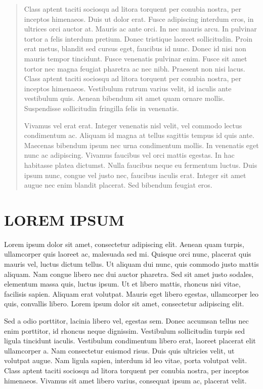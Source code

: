 \documentclass[rascunho,xindy]{fei}
\begin{document}
\begin{abstract}
Class aptent taciti sociosqu ad litora torquent per conubia nostra, per inceptos himenaeos. Duis ut dolor erat. Fusce adipiscing interdum eros, in ultrices orci auctor at. Mauris ac ante orci. In nec mauris arcu. In pulvinar tortor a felis interdum pretium. Donec tristique laoreet sollicitudin. Proin erat metus, blandit sed cursus eget, faucibus id nunc. Donec id nisi non mauris tempor tincidunt. Fusce venenatis pulvinar enim. Fusce sit amet tortor nec magna feugiat pharetra ac nec nibh. Praesent non nisi lacus. Class aptent taciti sociosqu ad litora torquent per conubia nostra, per inceptos himenaeos. Vestibulum rutrum varius velit, id iaculis ante vestibulum quis. Aenean bibendum sit amet quam ornare mollis. Suspendisse sollicitudin fringilla felis in venenatis.

Vivamus vel erat erat. Integer venenatis nisl velit, vel commodo lectus condimentum ac. Aliquam id magna at tellus sagittis tempus id quis ante. Maecenas bibendum ipsum nec urna condimentum mollis. In venenatis eget nunc ac adipiscing. Vivamus faucibus vel orci mattis egestas. In hac habitasse platea dictumst. Nulla faucibus neque eu fermentum luctus. Duis ipsum nunc, congue vel justo nec, faucibus iaculis erat. Integer sit amet augue nec enim blandit placerat. Sed bibendum feugiat eros.
\end{abstract}

\listoffigures
\listoftables
\listofalgorithms
\glsaddall
\printglossaries
\tableofcontents

\chapter{LOREM IPSUM}

Lorem ipsum dolor sit amet, consectetur adipiscing elit. Aenean quam turpis, ullamcorper quis laoreet ac, malesuada sed mi. Quisque orci nunc, placerat quis mauris vel, luctus dictum tellus. Ut aliquam dui nunc, quis commodo justo mattis aliquam. Nam congue libero nec dui auctor pharetra. Sed sit amet justo sodales, elementum massa quis, luctus ipsum. Ut et libero mattis, rhoncus nisi vitae, facilisis sapien. Aliquam erat volutpat. Mauris eget libero egestas, ullamcorper leo quis, convallis libero. Lorem ipsum dolor sit amet, consectetur adipiscing elit.

Sed a odio porttitor, lacinia libero vel, egestas sem. Donec accumsan tellus nec enim porttitor, id rhoncus neque dignissim. Vestibulum sollicitudin turpis sed ligula tincidunt iaculis. Vestibulum condimentum libero erat, laoreet placerat elit ullamcorper a. Nam consectetur euismod risus. Duis quis ultricies velit, ut volutpat augue. Nam ligula sapien, interdum id leo vitae, porta volutpat velit. Class aptent taciti sociosqu ad litora torquent per conubia nostra, per inceptos himenaeos. Vivamus sit amet libero varius, consequat ipsum ac, placerat velit.
\end{document}
